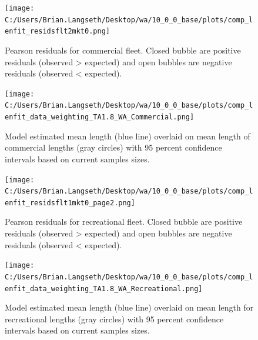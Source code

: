 \documentclass[11pt,
  english,
  a4paper,
]{article}
\begin{document}
\begin{figure}
\centering
\texttt{[image: C:/Users/Brian.Langseth/Desktop/wa/10\_0\_0\_base/plots/comp\_lenfit\_residsflt2mkt0.png]}
\caption{Pearson residuals for commercial fleet. Closed bubble are positive residuals (observed \textgreater{} expected) and open bubbles are negative residuals (observed \textless{} expected).\label{fig:com-pearson}}
\end{figure}

\tagmcend\tagstructend


\begin{figure}
\centering
\texttt{[image: C:/Users/Brian.Langseth/Desktop/wa/10\_0\_0\_base/plots/comp\_lenfit\_data\_weighting\_TA1.8\_WA\_Commercial.png]}
\caption{Model estimated mean length (blue line) overlaid on mean length of commercial lengths (gray circles) with 95 percent confidence intervals based on current samples sizes.\label{fig:com-mean-len-fit}}
\end{figure}

\tagmcend\tagstructend


\begin{figure}
\centering
\texttt{[image: C:/Users/Brian.Langseth/Desktop/wa/10\_0\_0\_base/plots/comp\_lenfit\_residsflt1mkt0\_page2.png]}
\caption{Pearson residuals for recreational fleet. Closed bubble are positive residuals (observed \textgreater{} expected) and open bubbles are negative residuals (observed \textless{} expected).\label{fig:rec-pearson}}
\end{figure}

\tagmcend\tagstructend


\begin{figure}
\centering
\texttt{[image: C:/Users/Brian.Langseth/Desktop/wa/10\_0\_0\_base/plots/comp\_lenfit\_data\_weighting\_TA1.8\_WA\_Recreational.png]}
\caption{Model estimated mean length (blue line) overlaid on mean length for recreational lengths (gray circles) with 95 percent confidence intervals based on current samples sizes.\label{fig:rec-mean-len-fit}}
\end{figure}
\end{document}
